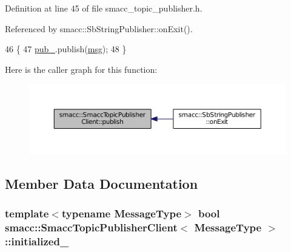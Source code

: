 Definition at line 45 of file smacc\+\_\+topic\+\_\+publisher.\+h.



Referenced by smacc\+::\+Sb\+String\+Publisher\+::on\+Exit().


\begin{DoxyCode}
46   \{
47     \hyperlink{classsmacc_1_1SmaccTopicPublisherClient_a29d9f2055484e74922c65f0c036e1e31}{pub\_}.publish(\hyperlink{namespacekeyboard__node_a768777e12f75b89e4a0a60acf748e9eb}{msg});
48   \}
\end{DoxyCode}


Here is the caller graph for this function\+:
\nopagebreak
\begin{figure}[H]
\begin{center}
\leavevmode
\includegraphics[width=350pt]{classsmacc_1_1SmaccTopicPublisherClient_a8f72ebf2cdb0b56b8288fde14c787c01_icgraph}
\end{center}
\end{figure}




\subsection{Member Data Documentation}
\subsubsection[{\texorpdfstring{initialized\+\_\+}{initialized_}}]{\setlength{\rightskip}{0pt plus 5cm}template$<$typename Message\+Type$>$ {\bf bool} {\bf smacc\+::\+Smacc\+Topic\+Publisher\+Client}$<$ Message\+Type $>$\+::initialized\+\_\+\hspace{0.3cm}{\ttfamily [private]}}\hypertarget{classsmacc_1_1SmaccTopicPublisherClient_a465e849ea4e7b61084495a1044692bf2}{}\label{classsmacc_1_1SmaccTopicPublisherClient_a465e849ea4e7b61084495a1044692bf2}


